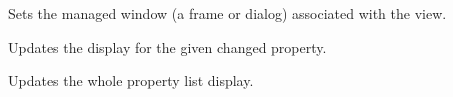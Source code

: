 \label{wxpropertylistviewsetmanagedwindow}


Sets the managed window (a frame or dialog) associated with the view.

\label{wxpropertylistviewupdatepropdisplay}


Updates the display for the given changed property.

\label{wxpropertylistviewupdateproplist}


Updates the whole property list display.


